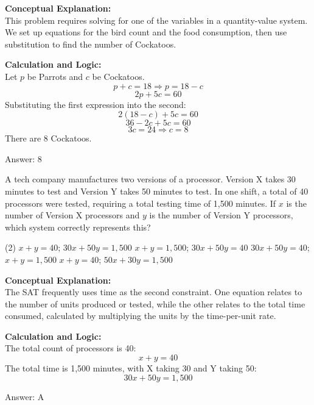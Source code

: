 \documentclass[11pt,paper=a4,answers]{exam}
\begin{document}
\begin{questions}
\begin{solution}
\textbf{Conceptual Explanation:} \\
This problem requires solving for one of the variables in a quantity-value system. We set up equations for the bird count and the food consumption, then use substitution to find the number of Cockatoos.

\vspace{10pt}
\textbf{Calculation and Logic:} \\
Let $p$ be Parrots and $c$ be Cockatoos.
\[p + c = 18 \Rightarrow p = 18 - c\]
\[2p + 5c = 60\]
Substituting the first expression into the second:
\[2(18 - c) + 5c = 60\]
\[36 - 2c + 5c = 60\]
\[3c = 24 \Rightarrow c = 8\]
There are 8 Cockatoos.

\vspace{15pt}
Answer: \colorbox{yellow!100}{8}
\end{solution}

\question
A tech company manufactures two versions of a processor. Version X takes 30 minutes to test and Version Y takes 50 minutes to test. In one shift, a total of 40 processors were tested, requiring a total testing time of 1,500 minutes. If $x$ is the number of Version X processors and $y$ is the number of Version Y processors, which system correctly represents this?
\begin{tasks}(2)
    \task $x + y = 40$; $30x + 50y = 1,500$
    \task $x + y = 1,500$; $30x + 50y = 40$
    \task $30x + 50y = 40$; $x + y = 1,500$
    \task $x + y = 40$; $50x + 30y = 1,500$
\end{tasks}

\begin{solution}
\textbf{Conceptual Explanation:} \\
The SAT frequently uses time as the second constraint. One equation relates to the number of units produced or tested, while the other relates to the total time consumed, calculated by multiplying the units by the time-per-unit rate.

\vspace{10pt}
\textbf{Calculation and Logic:} \\
The total count of processors is 40:
\[x + y = 40\]
The total time is 1,500 minutes, with X taking 30 and Y taking 50:
\[30x + 50y = 1,500\]

\vspace{15pt}
Answer: \colorbox{yellow!100}{A}
\end{solution}


\end{questions}
\end{document}
